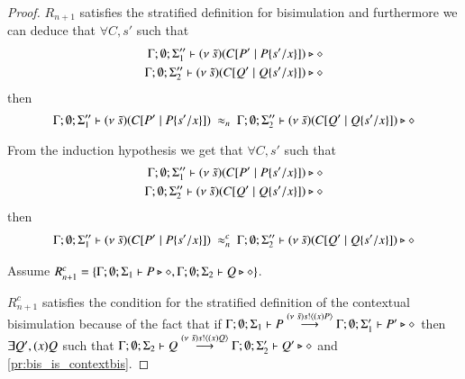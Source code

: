 \begin{proof}

	$R_{n+1}$ satisfies the stratified definition for bisimulation and furthermore we can deduce that
	$\forall C, s'$
	such that
	\begin{eqnarray*}
		\Gamma; \emptyset; \Sigma_1'' \vdash (\nu\ \tilde{s})(C[P' \;|\; P \{s'/x \}]) \triangleright \diamond \\
		\Gamma; \emptyset; \Sigma_2'' \vdash (\nu\ \tilde{s})(C[Q' \;|\; Q \{s'/x \}]) \triangleright \diamond
	\end{eqnarray*}
	then
	\[
		\Gamma; \emptyset; \Sigma_1'' \proves \newsp{\tilde{s}}{\context{C}{P' \Par P \subst{s'}{x}}}\ \wb_{n}\ 
		\Gamma; \emptyset; \Sigma_2'' \proves \newsp{\tilde{s}}{\context{C}{Q' \Par Q \subst{s'}{x}}} \hastype \Proc
	\]

	From the induction hypothesis we get that
	$\forall C, s'$
	such that
	\begin{eqnarray*}
		\Gamma; \emptyset; \Sigma_1'' \vdash (\nu\ \tilde{s})(C[P' \;|\; P \{s'/x \}]) \triangleright \diamond \\
		\Gamma; \emptyset; \Sigma_2'' \vdash (\nu\ \tilde{s})(C[Q' \;|\; Q \{s'/x \}]) \triangleright \diamond
	\end{eqnarray*}
	then
	\begin{eqnarray}
		\Gamma; \emptyset; \Sigma_1'' \proves \newsp{\tilde{s}}{\context{C}{P' \Par P \subst{s'}{x}}}\ \wbc_{n}\ 
		\Gamma; \emptyset; \Sigma_2'' \proves \newsp{\tilde{s}}{\context{C}{Q' \Par Q \subst{s'}{x}}} \hastype \Proc
		\label{pr:bis_is_contextbis}
	\end{eqnarray}


	Assume $R^c_{n+1} = \{\Gamma; \emptyset; \Sigma_1 \vdash P \triangleright \diamond, \Gamma; \emptyset; \Sigma_2 \vdash Q \triangleright \diamond\}$.

	$R^c_{n+1}$ satisfies the condition for the stratified definition of the contextual bisimulation because of the fact that
	if $\Gamma; \emptyset; \Sigma_1 \vdash P \stackrel{(\nu\ \tilde{s}) s ! \langle (x)P \rangle}{\longrightarrow} \Gamma; \emptyset; \Sigma_1' \vdash P' \triangleright \diamond$ then
	$\exists Q', (x)Q$ such that
	$\Gamma; \emptyset; \Sigma_2 \vdash Q \stackrel{(\nu\ \tilde{s}) s ! \langle (x)Q \rangle}{\longrightarrow} \Gamma; \emptyset; \Sigma_2' \vdash Q' \triangleright \diamond$
	and \ref{pr:bis_is_contextbis}.


\end{proof}
